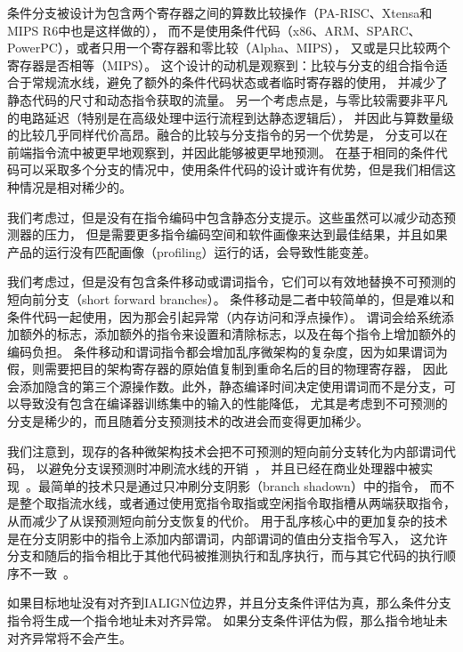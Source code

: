 \begin{commentary} 

条件分支被设计为包含两个寄存器之间的算数比较操作（PA-RISC、Xtensa和MIPS R6中也是这样做的），
而不是使用条件代码（x86、ARM、SPARC、PowerPC），或者只用一个寄存器和零比较（Alpha、MIPS），
又或是只比较两个寄存器是否相等（MIPS）。
这个设计的动机是观察到：比较与分支的组合指令适合于常规流水线，避免了额外的条件代码状态或者临时寄存器的使用，
并减少了静态代码的尺寸和动态指令获取的流量。
另一个考虑点是，与零比较需要非平凡的电路延迟（特别是在高级处理中运行流程到达静态逻辑后），
并因此与算数量级的比较几乎同样代价高昂。融合的比较与分支指令的另一个优势是，
分支可以在前端指令流中被更早地观察到，并因此能够被更早地预测。
在基于相同的条件代码可以采取多个分支的情况中，使用条件代码的设计或许有优势，但是我们相信这种情况是相对稀少的。

我们考虑过，但是没有在指令编码中包含静态分支提示。这些虽然可以减少动态预测器的压力，
但是需要更多指令编码空间和软件画像来达到最佳结果，并且如果产品的运行没有匹配画像（profiling）运行的话，会导致性能变差。

我们考虑过，但是没有包含条件移动或谓词指令，它们可以有效地替换不可预测的短向前分支（short forward branches）。
条件移动是二者中较简单的，但是难以和条件代码一起使用，因为那会引起异常（内存访问和浮点操作）。
谓词会给系统添加额外的标志，添加额外的指令来设置和清除标志，以及在每个指令上增加额外的编码负担。
条件移动和谓词指令都会增加乱序微架构的复杂度，因为如果谓词为假，则需要把目的架构寄存器的原始值复制到重命名后的目的物理寄存器，
因此会添加隐含的第三个源操作数。此外，静态编译时间决定使用谓词而不是分支，可以导致没有包含在编译器训练集中的输入的性能降低，
尤其是考虑到不可预测的分支是稀少的，而且随着分支预测技术的改进会而变得更加稀少。

我们注意到，现存的各种微架构技术会把不可预测的短向前分支转化为内部谓词代码，
以避免分支误预测时冲刷流水线的开销~\cite{heil-tr1996,Klauser-1998,Kim-micro2005}，
并且已经在商业处理器中被实现~\cite{ibmpower7}。最简单的技术只是通过只冲刷分支阴影（branch shadown）中的指令，
而不是整个取指流水线，或者通过使用宽指令取指或空闲指令取指槽从两端获取指令，从而减少了从误预测短向前分支恢复的代价。
用于乱序核心中的更加复杂的技术是在分支阴影中的指令上添加内部谓词，内部谓词的值由分支指令写入，
这允许分支和随后的指令相比于其他代码被推测执行和乱序执行，而与其它代码的执行顺序不一致~\cite{ibmpower7}。
\end{commentary}

如果目标地址没有对齐到IALIGN位边界，并且分支条件评估为真，那么条件分支指令将生成一个指令地址未对齐异常。
如果分支条件评估为假，那么指令地址未对齐异常将不会产生。


